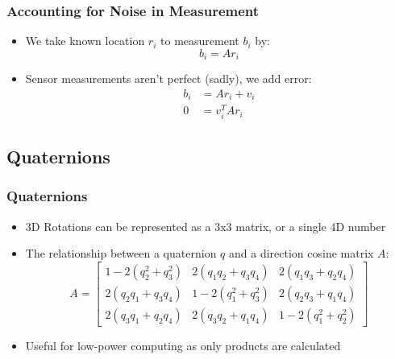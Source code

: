 \documentclass[11pt]{beamer}
\begin{document}
    \begin{frame}
        \frametitle{Accounting for Noise in Measurement}
        \begin{itemize}[<+->]
            \item We take known location $r_i$ to measurement $b_i$ by:
            \begin{equation}
                b_i = A r_i
            \end{equation} \medskip
            \item Sensor measurements aren't perfect (sadly), we add error: \medskip
            \begin{align}
                b_i &= A r_i + v_i \\
                0 &= v_i^T A r_i
            \end{align}
        \end{itemize}
    \end{frame}

    \subsection{Quaternions}\label{subsec:quaternions}
    \begin{frame}
        \frametitle{Quaternions}
        \begin{itemize}[<+->]
            \item 3D Rotations can be represented as a 3x3 matrix, or a single 4D number \medskip
            \item The relationship between a quaternion $q$ and a direction cosine matrix $A$:
            \begin{equation}
                A =
                \begin{bmatrix}
                    1 - 2(q_2^2 + q_3^2) & 2(q_1 q_2 + q_3 q_4) & 2(q_1 q_3 + q_2 q_4) \\
                    2(q_2 q_1 + q_3 q_4) & 1-2(q_1^2+q_3^2) & 2(q_2 q_3 + q_1 q_4) \\
                    2(q_3 q_1 + q_2 q_4) & 2(q_3 q_2 + q_1 q_4) & 1 - 2(q_1^2+q_2^2)
                \end{bmatrix}
            \end{equation}
            \item Useful for low-power computing as only products are calculated
        \end{itemize}
    \end{frame}
\end{document}

